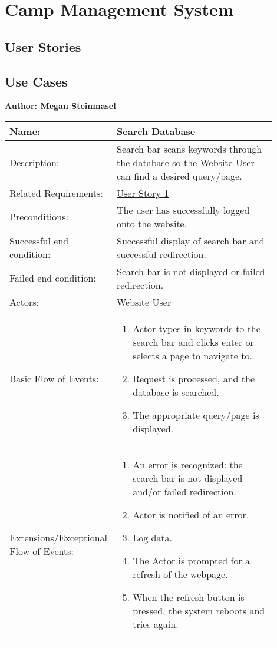 \documentclass[11pt]{article}
\begin{document}
\clearpage

\appendix
\section{Camp Management System}\label{appendix:camp_sys}
\subsection{User Stories}
\subsection{Use Cases}


\begin{table}[!htb]
\begin{center}
\textbf{Author: Megan Steinmasel}
\vspace*{1em}
\begin{tabular}{p{0.30\linewidth}p{0.60\linewidth}}
	Name: & Search Database\\\hline
	Description: & Search bar scans keywords through the database so the Website User can find a desired query/page.\\\hline
	Related Requirements:& \hyperlink{us1}{User Story 1}\\\hline
	Preconditions:& The user has successfully logged onto the website.\\\hline
	Successful end condition:& Successful display of search bar and successful redirection.\\\hline
	Failed end condition:& Search bar is not displayed or failed redirection. \\\hline
	Actors:& Website User\\\hline
	Basic Flow of Events: & \begin{enumerate}
	\item Actor types in keywords to the search bar and clicks enter or selects a page to navigate to.
	\item Request is processed, and the database is searched.
	\item The appropriate query/page is displayed.
	\end{enumerate}\\\hline
	Extensions/Exceptional Flow of Events: & \begin{enumerate}
	\item An error is recognized: the search bar is not displayed and/or failed redirection.
	\item Actor is notified of an error.
	\item Log data.
	\item The Actor is prompted for a refresh of the webpage.
	\item When the refresh button is pressed, the system reboots and tries again.
	\end{enumerate}
\end{tabular}
\label{des:}	
\end{center}
\end{table}
\end{document}
